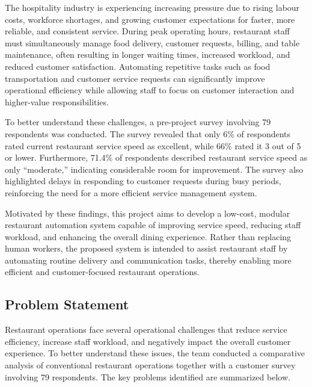 \documentclass[12pt,a4paper]{article}
\begin{document}
The hospitality industry is experiencing increasing pressure due to rising labour costs, workforce shortages, and growing customer expectations for faster, more reliable, and consistent service. During peak operating hours, restaurant staff must simultaneously manage food delivery, customer requests, billing, and table maintenance, often resulting in longer waiting times, increased workload, and reduced customer satisfaction. Automating repetitive tasks such as food transportation and customer service requests can significantly improve operational efficiency while allowing staff to focus on customer interaction and higher-value responsibilities.

To better understand these challenges, a pre-project survey involving 79 respondents was conducted. The survey revealed that only 6\% of respondents rated current restaurant service speed as excellent, while 66\% rated it 3 out of 5 or lower. Furthermore, 71.4\% of respondents described restaurant service speed as only ``moderate,'' indicating considerable room for improvement. The survey also highlighted delays in responding to customer requests during busy periods, reinforcing the need for a more efficient service management system.

Motivated by these findings, this project aims to develop a low-cost, modular restaurant automation system capable of improving service speed, reducing staff workload, and enhancing the overall dining experience. Rather than replacing human workers, the proposed system is intended to assist restaurant staff by automating routine delivery and communication tasks, thereby enabling more efficient and customer-focused restaurant operations.

\subsection{Problem Statement}

Restaurant operations face several operational challenges that reduce
service efficiency, increase staff workload, and negatively impact the
overall customer experience. To better understand these issues, the
team conducted a comparative analysis of conventional restaurant
operations together with a customer survey involving 79 respondents.
The key problems identified are summarized below.
\end{document}
